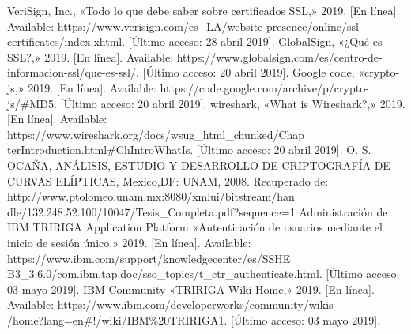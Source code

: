 \documentclass[12pt, a4paper, titlepage]{report}
\begin{document}
\begin{thebibliography}{20}
         VeriSign, Inc., «Todo lo que debe saber sobre certificados SSL,» 2019. [En línea]. Available: https://www.verisign.com/es\_LA/website-presence/online/ssl-certificates/index.xhtml. [Último acceso: 28 abril 2019].
        GlobalSign, «¿Qué es SSL?,» 2019. [En línea]. Available: https://www.globalsign.com/es/centro-de-informacion-ssl/que-es-ssl/. [Último acceso: 20 abril 2019].
        Google code, «crypto-js,» 2019. [En línea]. Available: https://code.google.com/archive/p/crypto-js/\#MD5. [Último acceso: 20 abril 2019].
        wireshark, «What is Wireshark?,» 2019. [En línea]. Available: https://www.wireshark.org/docs/wsug\_html\_chunked/Chap\\terIntroduction.html\#ChIntroWhatIs. [Último acceso: 20 abril 2019].
        O. S. OCAÑA, ANÁLISIS, ESTUDIO Y DESARROLLO DE CRIPTOGRAFÍA DE CURVAS ELÍPTICAS, Mexico,DF: UNAM, 2008. Recuperado de: http://www.ptolomeo.unam.mx:8080/xmlui/bitstream/han\\dle/132.248.52.100/10047/Tesis\_Completa.pdf?sequence=1
        Administración de IBM TRIRIGA Application Platform «Autenticación de usuarios mediante el inicio de sesión único,» 2019. [En línea]. Available: https://www.ibm.com/support/knowledgecenter/es/SSHE\\B3\_3.6.0/com.ibm.tap.doc/sso\_topics/t\_ctr\_authenticate.html. [Último acceso: 03 mayo 2019].
        IBM Community «TRIRIGA Wiki Home,» 2019. [En línea]. Available: 	https://www.ibm.com/developerworks/community/wikis\\
        /home?lang=en\#!/wiki/IBM\%20TRIRIGA1. [Último acceso: 03 mayo 2019].
	\end{thebibliography}	
\end{document}
